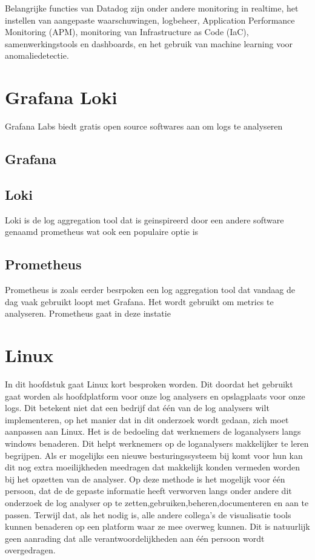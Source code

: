 Belangrijke functies van Datadog zijn onder andere monitoring in realtime, het instellen van aangepaste waarschuwingen, logbeheer, Application Performance Monitoring (APM), monitoring van Infrastructure as Code (IaC), samenwerkingstools en dashboards, en het gebruik van machine learning voor anomaliedetectie.

\section{Grafana Loki}
Grafana Labs biedt gratis open source softwares aan om logs te analyseren

\subsection{Grafana}

\subsection{Loki}
Loki is de log aggregation tool dat is geinspireerd door een andere software genaamd prometheus wat ook een populaire optie is 

\subsection{Prometheus}
Prometheus is zoals eerder besrpoken een log aggregation tool dat vandaag de dag vaak gebruikt loopt met Grafana. Het wordt gebruikt om metrics te analyseren. Prometheus gaat in deze instatie 

\section{Linux}
In dit hoofdstuk gaat Linux kort besproken worden. Dit doordat het gebruikt gaat worden als hoofdplatform voor onze log analysers en opslagplaats voor onze logs. Dit betekent niet dat een bedrijf dat één van de log analysers wilt implementeren, op het manier dat in dit onderzoek wordt gedaan, zich moet aanpassen aan Linux. Het is de bedoeling dat werknemers de loganalysers langs windows benaderen. Dit helpt werknemers op de loganalysers makkelijker te leren begrijpen. Als er mogelijks een nieuwe besturingssysteem bij komt voor hun kan dit nog extra moeilijkheden meedragen dat makkelijk konden vermeden worden bij het opzetten van de analyser. Op deze methode is het mogelijk voor één persoon, dat de de gepaste informatie heeft verworven langs onder andere dit onderzoek de log analyser op te zetten,gebruiken,beheren,documenteren en aan te passen. Terwijl dat, als het nodig is, alle andere collega's de visualisatie tools kunnen benaderen op een platform waar ze mee overweg kunnen. Dit is natuurlijk geen aanrading dat alle verantwoordelijkheden aan één persoon wordt overgedragen.


